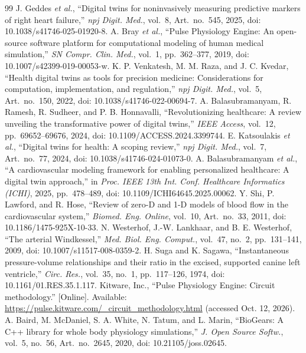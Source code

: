 \documentclass[conference]{IEEEtran}
\begin{document}
\begin{thebibliography}{99}
 J. Geddes \textit{et al.}, ``Digital twins for noninvasively measuring predictive markers of right heart failure,'' \textit{npj Digit. Med.}, vol.~8, Art.~no.~545, 2025, doi: 10.1038/s41746-025-01920-8.
 A. Bray \textit{et al.}, ``Pulse Physiology Engine: An open-source software platform for computational modeling of human medical simulation,'' \textit{SN Compr. Clin. Med.}, vol.~1, pp.~362--377, 2019, doi: 10.1007/s42399-019-00053-w.
 K. P. Venkatesh, M. M. Raza, and J. C. Kvedar, ``Health digital twins as tools for precision medicine: Considerations for computation, implementation, and regulation,'' \textit{npj Digit. Med.}, vol.~5, Art.~no.~150, 2022, doi: 10.1038/s41746-022-00694-7.
 A. Balasubramanyam, R. Ramesh, R. Sudheer, and P. B. Honnavalli, ``Revolutionizing healthcare: A review unveiling the transformative power of digital twins,'' \textit{IEEE Access}, vol.~12, pp.~69652--69676, 2024, doi: 10.1109/ACCESS.2024.3399744.
 E. Katsoulakis \textit{et al.}, ``Digital twins for health: A scoping review,'' \textit{npj Digit. Med.}, vol.~7, Art.~no.~77, 2024, doi: 10.1038/s41746-024-01073-0.
 A. Balasubramanyam \textit{et al.}, ``A cardiovascular modeling framework for enabling personalized healthcare: A digital twin approach,'' in \textit{Proc. IEEE 13th Int. Conf. Healthcare Informatics (ICHI)}, 2025, pp.~478--489, doi: 10.1109/ICHI64645.2025.00062.
 Y. Shi, P. Lawford, and R. Hose, ``Review of zero-D and 1-D models of blood flow in the cardiovascular system,'' \textit{Biomed. Eng. Online}, vol.~10, Art.~no.~33, 2011, doi: 10.1186/1475-925X-10-33.
 N. Westerhof, J.-W. Lankhaar, and B. E. Westerhof, ``The arterial Windkessel,'' \textit{Med. Biol. Eng. Comput.}, vol.~47, no.~2, pp.~131--141, 2009, doi: 10.1007/s11517-008-0359-2.
 H. Suga and K. Sagawa, ``Instantaneous pressure-volume relationships and their ratio in the excised, supported canine left ventricle,'' \textit{Circ. Res.}, vol.~35, no.~1, pp.~117--126, 1974, doi: 10.1161/01.RES.35.1.117.
 Kitware, Inc., ``Pulse Physiology Engine: Circuit methodology.'' [Online]. Available: \url{https://pulse.kitware.com/_circuit_methodology.html} (accessed Oct. 12, 2026).
 A. Baird, M. McDaniel, S. A. White, N. Tatum, and L. Marin, ``BioGears: A C++ library for whole body physiology simulations,'' \textit{J. Open Source Softw.}, vol.~5, no.~56, Art.~no.~2645, 2020, doi: 10.21105/joss.02645.

\end{thebibliography}
\end{document}
